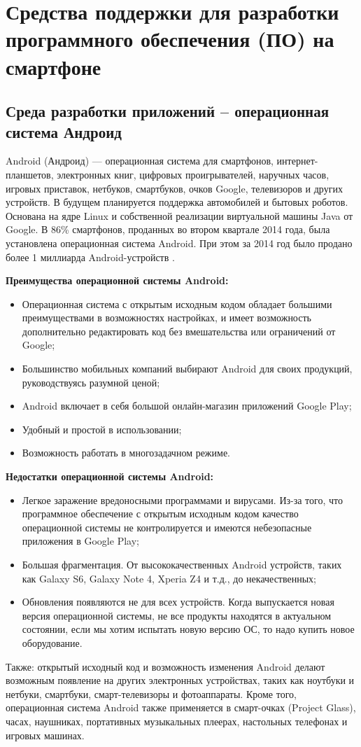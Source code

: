 \section{Средства поддержки для разработки программного обеспечения (ПО) на смартфоне}
\subsection{Среда разработки приложений – операционная система Андроид}
Android (Андроид) — операционная система для смартфонов, интернет-планшетов, электронных книг, цифровых проигрывателей, наручных часов, игровых приставок, нетбуков, смартбуков, очков Google, телевизоров и других устройств. В будущем планируется поддержка автомобилей и бытовых роботов. Основана на ядре Linux и собственной реализации виртуальной машины Java от Google. В 86\% смартфонов, проданных во втором квартале 2014 года, была установлена операционная система Android. При этом за 2014 год было продано более 1 миллиарда Android-устройств \cite{android}.

\textbf{Преимущества операционной системы Android:}

\begin{itemize}
	\item Операционная система с открытым исходным кодом обладает большими преимуществами в возможностях настройках, и имеет возможность дополнительно редактировать код без вмешательства или ограничений от Google;
	\item Большинство мобильных компаний выбирают  Android для своих продукций, руководствуясь разумной ценой;
	\item Android включает в себя большой онлайн-магазин приложений Google Play; 
	\item Удобный и простой в использовании;
	\item Возможность работать в многозадачном режиме.

\end{itemize}

\textbf{Недостатки операционной системы Android:}

\begin{itemize}
	\item Легкое заражение вредоносными программами и вирусами. Из-за того, что программное обеспечение с открытым исходным кодом качество операционной системы не контролируется и имеются небезопасные приложения в Google Play;
	\item Большая фрагментация. От высококачественных Android устройств, таких как Galaxy S6, Galaxy Note 4, Xperia Z4 и т.д., до некачественных;
\item Обновления появляются не для всех устройств. Когда выпускается новая версия операционной системы, не все продукты находятся в актуальном состоянии, если мы хотим испытать новую версию ОС, то надо купить новое оборудование.

\end{itemize}
Также: открытый исходный код и возможность изменения Android делают возможным появление на других электронных устройствах, таких как ноутбуки и нетбуки, смартбуки, смарт-телевизоры и фотоаппараты. Кроме того, операционная система Android также применяется в смарт-очках (Project Glass), часах, наушниках, портативных музыкальных плеерах, настольных телефонах и игровых машинах.
